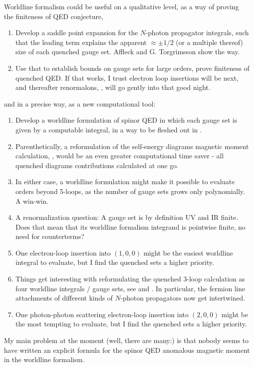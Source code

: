 Worldline formalism could be useful on a qualitative level, as a way of
proving the finiteness of QED conjecture,
    \begin{enumerate}
  \item
Develop a saddle point expansion for the $N$-photon propagator
integrals, such that the
leading term explains the apparent $\approx \pm 1/2$ (or a multiple
thereof) size of each quenched gauge set. Affleck \etal{}
and G. Torgrimsson \etal{} show the way.
  \item
Use that to establish bounds on gauge sets for large orders, prove
finiteness of quenched QED. If that works, I trust electron loop
insertions will be next, and thereafter renormalons, \etc,
will go 
{gently into that good night}.
    \end{enumerate}
and in a precise way, as a new computational tool:
    \begin{enumerate}
  \item
Develop a worldline formulation of spinor QED in which each gauge set is
given by a computable integral, in a way to be fleshed out in
.
  \item
Parenthetically, a reformulation of the self-energy diagrams magnetic
moment calculation, , would be an even greater
computational time saver - all quenched diagrams contributions calculated
at one go.
  \item
In either case, a
worldline formulation might make it possible to evaluate orders beyond
5-loops, as the number of gauge sets grows only polynomially. A win-win.
  \item
A renormalization question:
A gauge set is by definition UV and IR finite. Does that mean
that its worldline formalism integrand is pointwise finite, no need for
counterterms?
  \item
One electron-loop insertion into $(1,0,0)$  might be the easiest
worldline integral to
evaluate, but I find the quenched sets a higher priority.
  \item
Things get interesting with reformulating the quenched 3-loop calculation
as four worldline integrals / gauge sets, see  and
. In particular, the fermion line attachments of
different kinds of $N$-photon propagators now get intertwined.
  \item
One photon-photon scattering electron-loop insertion into $(2,0,0)$ might
be the most tempting to evaluate, but I find the quenched sets a higher
priority.
    \end{enumerate}
My main problem at the moment (well, there are many:) is that nobody
seems to have written an explicit formula for the spinor QED anomalous
magnetic moment in the worldline formalism.
